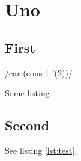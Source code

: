 \documentclass{report}
\begin{document}
\chapter{Uno}
\section{First}
\begin{listing}
  /car (cons 1 '(2))/
  \caption{Some listing}
  \label{lst:test}
\end{listing}

\section{Second}
See listing \ref{lst:test}.

\listoflistings
\end{document}
